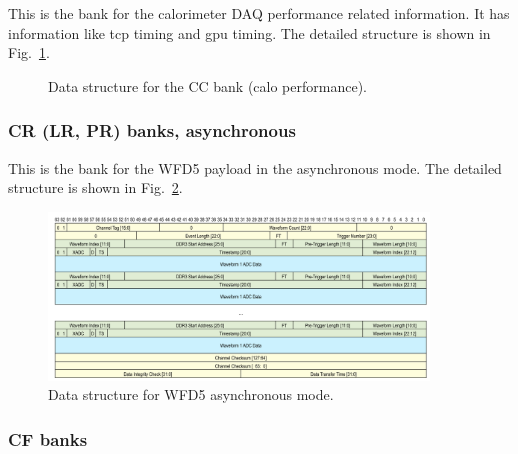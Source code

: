 This is the bank for the calorimeter DAQ performance related information.
It has information like tcp timing and gpu timing. The detailed structure is shown in Fig.~\ref{fig:CCBankFormat}.

\begin{figure}[htbp]
\centering
{}
\caption{Data structure for the CC bank (calo performance).}\label{fig:CCBankFormat}
\end{figure}

\subsubsection*{CR (LR, PR) banks, asynchronous}

This is the bank for the WFD5 payload in the asynchronous mode. The detailed structure is shown in Fig.~\ref{fig:AsyncRiderData}.

\begin{figure}[htbp]
\centering
\includegraphics[width=0.9\textwidth]{pics/AsyncRiderData.pdf} 
\caption{Data structure for WFD5 asynchronous mode.}\label{fig:AsyncRiderData}
\end{figure}

\subsubsection*{CF banks}

